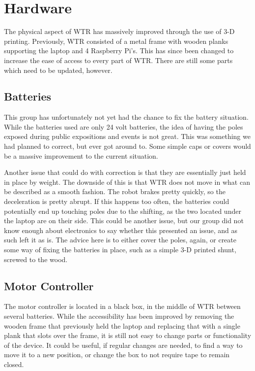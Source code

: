 \section{Hardware}
The physical aspect of WTR has massively improved through the use of 3-D printing.
Previously, WTR consisted of a metal frame with wooden planks supporting the laptop and 4 Raspberry Pi's.
This has since been changed to increase the ease of access to every part of WTR.
There are still some parts which need to be updated, however.

\subsection{Batteries}
This group has unfortunately not yet had the chance to fix the battery situation.
While the batteries used are only 24 volt batteries, the idea of having the poles exposed during public expositions and events is not great.
This was something we had planned to correct, but ever got around to.
Some simple caps or covers would be a massive improvement to the current situation.

Another issue that could do with correction is that they are essentially just held in place by weight.
The downside of this is that WTR does not move in what can be described as a smooth fashion.
The robot brakes pretty quickly, so the deceleration is pretty abrupt.
If this happens too often, the batteries could potentially end up touching poles due to the shifting, as the two located under the laptop are on their side.
This could be another issue, but our group did not know enough about electronics to say whether this presented an issue, and as such left it as is.
The advice here is to either cover the poles, again, or create some way of fixing the batteries in place, such as a simple 3-D printed shunt, screwed to the wood.

\subsection{Motor Controller}
The motor controller is located in a black box, in the middle of WTR between several batteries.
While the accessibility has been improved by removing the wooden frame that previously held the laptop and replacing that with a single plank that slots over the frame, it is still not easy to change parts or functionality of the device.
It could be useful, if regular changes are needed, to find a way to move it to a new position, or change the box to not require tape to remain closed.

